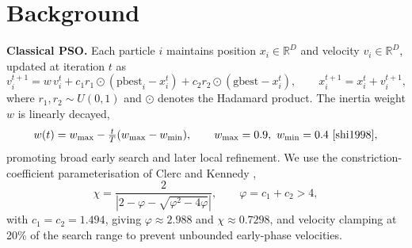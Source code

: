 \documentclass[11pt]{article}
\begin{document}
\vspace{-0.3em}
\section{Background}
\textbf{Classical PSO.} Each particle $i$ maintains position $x_i \in \mathbb{R}^D$ and velocity $v_i \in \mathbb{R}^D$, updated at iteration $t$ as
\begin{equation}
v_i^{t+1} = w\,v_i^t + c_1 r_1 \odot (\mathrm{pbest}_i - x_i^t) + c_2 r_2 \odot (\mathrm{gbest} - x_i^t), \qquad x_i^{t+1} = x_i^t + v_i^{t+1},
\end{equation}
where $r_1, r_2 \sim U(0,1)$ and $\odot$ denotes the Hadamard product. The inertia weight $w$ is linearly decayed,
\begin{equation}
w(t) = w_{\max} - \tfrac{t}{T}(w_{\max}-w_{\min}), \qquad w_{\max}=0.9,\ w_{\min}=0.4 \ \text{\cite{shi1998}},
\end{equation}
promoting broad early search and later local refinement. We use the constriction-coefficient parameterisation of Clerc and Kennedy \cite{clerc2002},
\begin{equation}
\chi = \frac{2}{\left|2-\varphi-\sqrt{\varphi^2-4\varphi}\right|}, \qquad \varphi = c_1+c_2 > 4,
\end{equation}
with $c_1=c_2=1.494$, giving $\varphi \approx 2.988$ and $\chi \approx 0.7298$, and velocity clamping at 20\% of the search range to prevent unbounded early-phase velocities.
\end{document}
